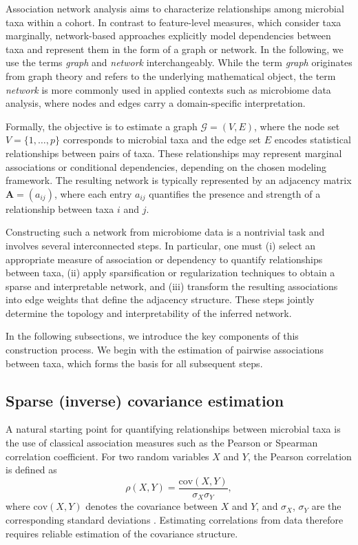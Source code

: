 Association network analysis aims to characterize relationships among microbial taxa within a cohort. In contrast to feature-level measures, which consider taxa marginally, network-based approaches explicitly model dependencies between taxa and represent them in the form of a graph or network. In the following, we use the terms \emph{graph} and \emph{network} interchangeably. While the term \emph{graph} originates from graph theory and refers to the underlying mathematical object, the term \emph{network} is more commonly used in applied contexts such as microbiome data analysis, where nodes and edges carry a domain-specific interpretation.

Formally, the objective is to estimate a graph $\mathcal{G} = (V, E)$, where the node set $V = \{1, \dots, p\}$ corresponds to microbial taxa and the edge set $E$ encodes statistical relationships between pairs of taxa. These relationships may represent marginal associations or conditional dependencies, depending on the chosen modeling framework. The resulting network is typically represented by an adjacency matrix $\mathbf{A} = (a_{ij})$, where each entry $a_{ij}$ quantifies the presence and strength of a relationship between taxa $i$ and $j$.

Constructing such a network from microbiome data is a nontrivial task and involves several interconnected steps. In particular, one must (i) select an appropriate measure of association or dependency to quantify relationships between taxa, (ii) apply sparsification or regularization techniques to obtain a sparse and interpretable network, and (iii) transform the resulting associations into edge weights that define the adjacency structure. These steps jointly determine the topology and interpretability of the inferred network.

In the following subsections, we introduce the key components of this construction process. We begin with the estimation of pairwise associations between taxa, which forms the basis for all subsequent steps.

\subsection{Sparse (inverse) covariance estimation}
\label{sec:5net:net_constr:sparse_cov_est}

A natural starting point for quantifying relationships between microbial taxa is the use of classical association measures such as the Pearson or Spearman correlation coefficient. For two random variables $X$ and $Y$, the Pearson correlation is defined as
\begin{equation}
\rho(X,Y)=\frac{\mathrm{cov}(X,Y)}{\sigma_X \sigma_Y},
\end{equation}
where $\mathrm{cov}(X,Y)$ denotes the covariance between $X$ and $Y$, and $\sigma_X$, $\sigma_Y$ are the corresponding standard deviations \citep{schober2018correlation}. Estimating correlations from data therefore requires reliable estimation of the covariance structure.

